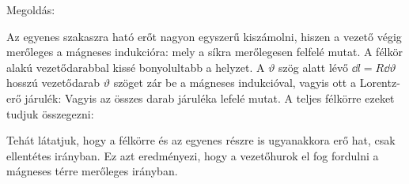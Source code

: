 
\ifdefined\megoldas

 Megoldás: 

 Az egyenes szakaszra ható erőt nagyon egyszerű kiszámolni, hiszen a vezető végig merőleges a mágneses indukcióra:
 mely a síkra merőlegesen felfelé mutat. A félkör alakú vezetődarabbal kissé bonyolultabb a helyzet. A $\vartheta$ szög alatt lévő $\dd l=R \dd \vartheta$ hosszú vezetődarab $\vartheta$ szöget zár be a mágneses indukcióval, vagyis ott a Lorentz-erő járulék:
 Vagyis az összes darab járuléka lefelé mutat. A teljes félkörre ezeket tudjuk összegezni:

 Tehát látatjuk, hogy a félkörre és az egyenes részre is ugyanakkora erő hat, csak ellentétes irányban. Ez azt eredményezi, hogy a vezetőhurok el fog fordulni a mágneses térre merőleges irányban.
 
\fi